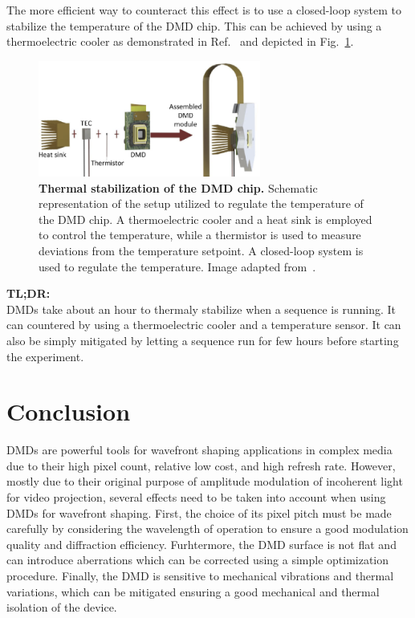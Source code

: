 \documentclass[12pt]{iopart}
\begin{document}
The more efficient way to counteract this effect is to use a
closed-loop system to stabilize the temperature of the DMD chip.
This can be achieved by using a thermoelectric cooler
as demonstrated in Ref.~\cite{Rudolf2021thermal}
and depicted in Fig.~\ref{fig:decorr_T}.

\begin{figure}
  \centering
  \includegraphics[width = 0.65\textwidth]{images/Cizmar_1.pdf}
  \caption{
    \textbf{Thermal stabilization of the DMD chip.}
    Schematic representation of the setup utilized to regulate the temperature of the DMD chip.
    A thermoelectric cooler and a heat sink is employed to control the temperature,
    while a thermistor is used to measure deviations from the temperature setpoint.
    A closed-loop system is used to regulate the temperature.
    Image adapted from~\cite{Rudolf2021thermal}.
  }
  \label{fig:decorr_T}
\end{figure}

\begin{tldr}
  \textbf{TL;DR:}\\
  DMDs take about an hour to thermaly stabilize when a sequence is running.
  It can countered by using a thermoelectric cooler
  and a temperature sensor.
  It can also be simply mitigated by letting a sequence run for few hours
  before starting the experiment.
\end{tldr}

\section{Conclusion}
DMDs are powerful tools for wavefront shaping applications in complex media
due to their high pixel count, relative low cost, and high refresh rate.
However, mostly due to their original purpose of amplitude modulation
of incoherent light for video projection,
several effects need to be taken into account when using DMDs for wavefront shaping.
First, the choice of its pixel pitch must be made carefully
by considering the wavelength of operation
to ensure a good modulation quality and diffraction efficiency.
Furhtermore, the DMD surface is not flat and can introduce aberrations
which can be corrected using a simple optimization procedure.
Finally, the DMD is sensitive to mechanical vibrations and thermal variations,
which can be mitigated ensuring a good mechanical and thermal isolation of the device.
\end{document}
